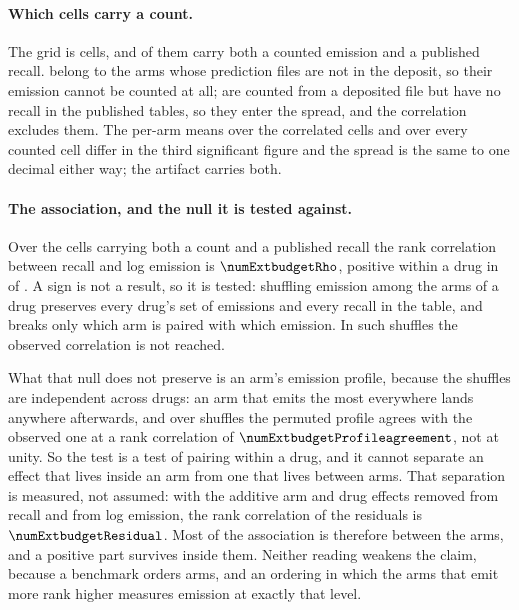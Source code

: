 \documentclass[journal=jcisd8,manuscript=suppinfo,layout=onecolumn]{achemso}
\begin{document}
\paragraph{Which cells carry a count.} The grid is \numExtbudgetGrid{} cells, and
\numExtbudgetCountedcells{} of them carry both a counted emission and a published recall.
\numExtbudgetAbsentnodeposit{} belong to the \numExtbudgetArmsnotdepositedWord{} arms whose
prediction files are not in the deposit, so their emission cannot be counted at all;
\numExtbudgetAbsentnorecallWord{} are counted from a deposited file but have no recall in the
published tables, so they enter the spread, and the correlation excludes them. The per-arm means
over the correlated cells and over every counted cell differ in the third significant figure and
the spread is the same to one decimal either way; the artifact carries both.

\paragraph{The association, and the null it is tested against.} Over the
\numExtbudgetCountedcells{} cells carrying both a count and a published recall the rank correlation
between recall and log emission is $\numExtbudgetRho$, positive within a drug in
\numExtbudgetWithinpositive{} of \numExtbudgetWithinn{}. A sign is not a result, so it is tested:
shuffling emission among the arms of a drug preserves every drug's set of emissions and every
recall in the table, and breaks only which arm is paired with which emission. In
\numExtbudgetPermutations{} such shuffles the observed correlation is not reached.

What that null does not preserve is an arm's emission profile, because the shuffles are independent
across drugs: an arm that emits the most everywhere lands anywhere afterwards, and over
\numExtbudgetProfilepermutations{} shuffles the permuted profile agrees with the observed one at a
rank correlation of $\numExtbudgetProfileagreement$, not at unity. So the test is a test of
pairing within a drug, and it cannot separate an effect that lives inside an arm from one that
lives between arms. That separation is measured, not assumed: with the additive arm and drug
effects removed from recall and from log emission, the rank correlation of the residuals is
$\numExtbudgetResidual$. Most of the association is therefore between the arms, and a positive part
survives inside them. Neither reading weakens the claim, because a benchmark orders arms, and an
ordering in which the arms that emit more rank higher measures emission at exactly that level.
\end{document}

